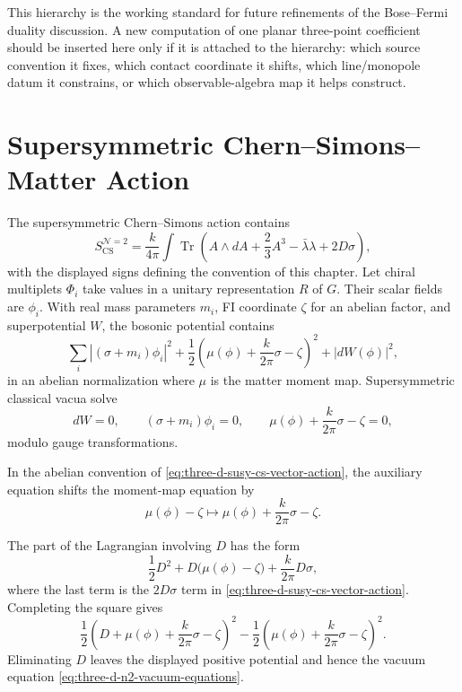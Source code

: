 \noindent
This hierarchy is the working standard for future refinements of the
Bose--Fermi duality discussion.  A new computation of one planar three-point
coefficient should be inserted here only if it is attached to the hierarchy:
which source convention it fixes, which contact coordinate it shifts, which
line/monopole datum it constrains, or which observable-algebra map it helps
construct.

\section{Supersymmetric Chern--Simons--Matter Action}

The supersymmetric Chern--Simons action contains
\begin{equation}
  S_{\mathrm{CS}}^{\mathcal N=2}
  =
  \frac{k}{4\pi}\int
  \operatorname{Tr}
  \left(
    A\wedge dA+\frac23A^3
    -\bar\lambda\lambda
    +2D\sigma
  \right),
  \label{eq:three-d-susy-cs-vector-action}
\end{equation}
with the displayed signs defining the convention of this chapter.  Let
chiral multiplets \(\Phi_i\) take values in a unitary representation \(R\) of
\(G\).  Their scalar fields are \(\phi_i\).  With real mass parameters
\(m_i\), FI coordinate \(\zeta\) for an abelian factor, and superpotential
\(W\), the bosonic potential contains
\begin{equation}
  \sum_i\left|(\sigma+m_i)\phi_i\right|^2
  +
  \frac12\left(\mu(\phi)+\frac{k}{2\pi}\sigma-\zeta\right)^2
  +
  |dW(\phi)|^2,
  \label{eq:three-d-n2-bosonic-potential}
\end{equation}
in an abelian normalization where \(\mu\) is the matter moment map.
Supersymmetric classical vacua solve
\begin{equation}
  dW=0,\qquad
  (\sigma+m_i)\phi_i=0,\qquad
  \mu(\phi)+\frac{k}{2\pi}\sigma-\zeta=0,
  \label{eq:three-d-n2-vacuum-equations}
\end{equation}
modulo gauge transformations.

\begin{remark}
\label{rem:three-d-cs-d-term-shift}
In the abelian convention of \eqref{eq:three-d-susy-cs-vector-action}, the
auxiliary equation shifts the moment-map equation by
\[
  \mu(\phi)-\zeta\longmapsto
  \mu(\phi)+\frac{k}{2\pi}\sigma-\zeta .
\]

The part of the Lagrangian involving \(D\) has the form
\[
  \frac12D^2+D\bigl(\mu(\phi)-\zeta\bigr)
  +\frac{k}{2\pi}D\sigma ,
\]
where the last term is the \(2D\sigma\) term in
\eqref{eq:three-d-susy-cs-vector-action}.  Completing the square gives
\[
  \frac12
  \left(D+\mu(\phi)+\frac{k}{2\pi}\sigma-\zeta\right)^2
  -
  \frac12
  \left(\mu(\phi)+\frac{k}{2\pi}\sigma-\zeta\right)^2 .
\]
Eliminating \(D\) leaves the displayed positive potential and hence the
vacuum equation \eqref{eq:three-d-n2-vacuum-equations}.
\end{remark}

